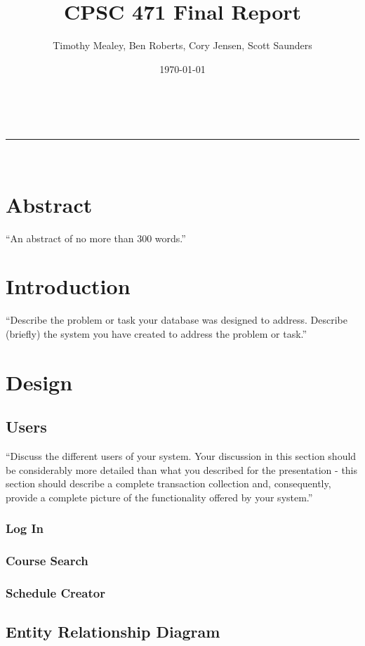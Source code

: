 \documentclass[twoside=false,a4paper,11pt]{article}
\makeatletter
\newcommand{\linia}{\rule{\linewidth}{0.5pt}}
\theoremstyle{mytheor}
\renewcommand{\maketitle}{
\begin{center}
\vspace{2ex}
{\huge \textsc{\@title}}
\vspace{1ex}
\\
\linia\\
\@author \hfill \@date
\vspace{4ex}
\end{center}
}
\makeatother
\begin{document}
\title{CPSC 471 Final Report}
\author{Timothy Mealey, Ben Roberts, Cory Jensen, Scott Saunders}
\date{\today}
\maketitle

\section*{Abstract}

``An abstract of no more than 300 words.''

\section*{Introduction}

``Describe the problem or task your database was designed to address.
Describe (briefly) the system you have created to address the problem or task.''

\section*{Design}

\subsection*{Users}

``Discuss the different users of your system. Your discussion in this section should be considerably more detailed than what you described for the presentation - this section should describe a complete transaction collection and, consequently, provide a complete picture of the functionality offered by your system.''

\subsubsection*{Log In}
\subsubsection*{Course Search}
\subsubsection*{Schedule Creator}

\subsection*{Entity Relationship Diagram}
\end{document}
